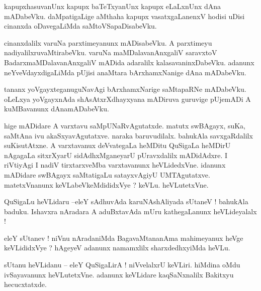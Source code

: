 \documentclass{article}
\begin{document}
\begin{mn}%
kapupxhasuvanUnx kapupx baTeTxyanUnx kapupx eLaLxnUnx dAna mADabeVku. daMpatigaLige aMthaha kapupx 
vasatxgaLanenxV hodisi uDisi cinanxda oDavegaLiMda saMtoVSapaDisabeVku.
\end{mn}

\begin{mn}%
cinanxdalilx varuNa parxtimeyanunx mADisabeVku. A parxtimeyu nadiyalilxruvaMtirabeVku. varuNa 
maMDalavanAnxgaliV saravxtoV BadarxmaMDalavanAnxgaliV mADida adaralilx kalasavaninxDabeVku. 
adanunx neYveVdayxdigaLiMda pUjisi anaMtara bArxhamxNanige dAna mADabeVku.
\end{mn}

\begin{mn}%
tananx yoVgayxteganuguNavAgi bArxhamxNarige saMtapaRNe mADabeVku. oLeLxya yoVgayxnAda 
shAsAtxrXdhayxyana mADiruva guruvige pUjemADi A kuMBavanunx dAnamADabeVku.
\end{mn}

\begin{mn}%
hige mADidare A varxtavu saMpUNaRvAgutatxde. matutx swBAgayx, suKa, saMtAna ivu akaSxyavAgutatxve. 
naraka baruvudilalx. bahukAla savxgaRdalilx suKisutAtxne. A varxtavanux deVvategaLa heMDitu 
QuSigaLa heMDirU nAgagaLa sitxrXyarU sidAdhxMganeyarU pUravxdalilx mADidAdxre. I riVtiyAgi I nadiV 
tirxtarxveMba varxtavanunx heVLidedxVne. idanunx mADidare swBAgayx saMtatigaLu satayxvAgiyU 
UMTAgutatxve. matetxVnanunx keVLabeVkeMdididxVye ? keVLu. heVLutetxVne.
\end{mn}



\begin{mn}%
QuSigaLu heVLidaru --eleY sAdhuvAda karuNAshAliyada sUtaneV ! bahukAla baduku. Ishavxra nAradara A 
aduBxtavAda mUru kathegaLanunx heVLideyalalx !
\end{mn}

\begin{mn}%
eleY sUtanev ! niVnu nAradaniMda BagavaMtananAma mahimeyanux heVge keVLididxVye ? hAgeyeV adanunx 
namamxlilx sharxdedhxyiMda heVLu.
\end{mn}

\begin{mn}%
sUtanu heVLidanu -- eleY QuSigaLirA ! niVvelalxrU keVLiri. hiMdina oMdu ivSayavanunx heVLutetxVne. 
adanunx keVLidare kaqSaNxnalilx Bakitxyu hecucxtatxde.
\end{mn}
\end{document}
